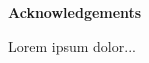 \thispagestyle{plain}
\begin{center}
    \Large        
    \textbf{Acknowledgements}
    \vspace{0.9cm}

\end{center}



Lorem ipsum dolor...